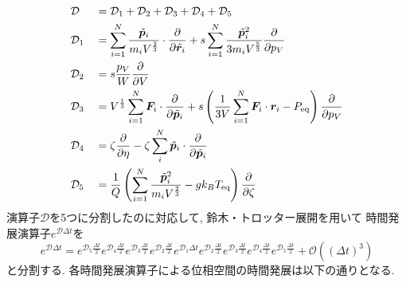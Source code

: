 \begin{alignat}{2}
 &\mathcal{D}
 &&=  \mathcal{D}_{1} + \mathcal{D}_{2} + \mathcal{D}_{3} + \mathcal{D}_{4} + \mathcal{D}_{5}
 \label{eq:NoseAndersen22.1}
 \\
 &\mathcal{D}_{1}
 &&=
 \sum_{i=1}^{N} \frac{\Tilde{\bm{p}}_{i}}{ m_{i} V^{\frac{2}{3}}}
 \cdot \frac{\partial}{\partial \Tilde{\bm{r}}_{i}}
 +
 s \sum_{i=1}^{N} \frac{\Tilde{\bm{p}}_{i}^{2}}{3m_{i} V^{\frac{5}{3}}}
 \frac{\partial}{\partial p_{V}}
 \label{eq:NoseAndersen22.2}
 \\
 &\mathcal{D}_{2}
 &&=
 s \frac{p_{V}}{W} \frac{\partial}{\partial V}
 \label{eq:NoseAndersen22.3}
 \\
 &\mathcal{D}_{3}
 &&=
 V^{\frac{1}{3}}  \sum_{i=1}^{N} \bm{F}_{i}
 \cdot \frac{\partial}{\partial \Tilde{\bm{p}}_{i}}
 +
  s \left(
          \frac{1}{3V} \sum_{i=1}^{N} \bm{F}_{i} \cdot \bm{r}_{i}
        - P_{\mathrm{eq}}
     \right)
  \frac{\partial}{\partial p_{V}}
 \label{eq:NoseAndersen22.4}
 \\
 &\mathcal{D}_{4}
 &&=
 \zeta \frac{\partial}{\partial \eta}
 -
 \zeta \sum_{i}^{N} \Tilde{\bm{p}}_{i} \cdot \frac{\partial}{\partial \Tilde{\bm{p}}_{i}}
 \label{eq:NoseAndersen22.5}
 \\
 &\mathcal{D}_{5}
 &&=
 \frac{1}{Q} \left(
                    \sum_{i=1}^{N} \frac{\Tilde{\bm{p}}_{i}^{2}}{m_{i} V^{\frac{2}{3}}}
                   - g k_{B} T_{\mathrm{eq}}
	       \right)
  \frac{\partial}{\partial \zeta} 
 \label{eq:NoseAndersen22.6}
\end{alignat}
演算子$\mathcal{D}$を5つに分割したのに対応して, 鈴木・トロッター展開を用いて
時間発展演算子$e^{\mathcal{D} \Delta t}$を
\begin{equation}
 e^{\mathcal{D} \Delta t}
  =
  e^{\mathcal{D}_{5} \frac{\Delta t}{2}}
  e^{\mathcal{D}_{4} \frac{\Delta t}{2}}
  e^{\mathcal{D}_{3} \frac{\Delta t}{2}}
  e^{\mathcal{D}_{2} \frac{\Delta t}{2}}
  e^{\mathcal{D}_{1} \Delta t}
  e^{\mathcal{D}_{2} \frac{\Delta t}{2}}
  e^{\mathcal{D}_{3} \frac{\Delta t}{2}}
  e^{\mathcal{D}_{4} \frac{\Delta t}{2}}
  e^{\mathcal{D}_{5} \frac{\Delta t}{2}}
  +
  \mathcal{O}\left( (\Delta t)^{3} \right)
 \label{eq:NoseAndersen23}
\end{equation}
と分割する. 各時間発展演算子による位相空間の時間発展は以下の通りとなる. 
